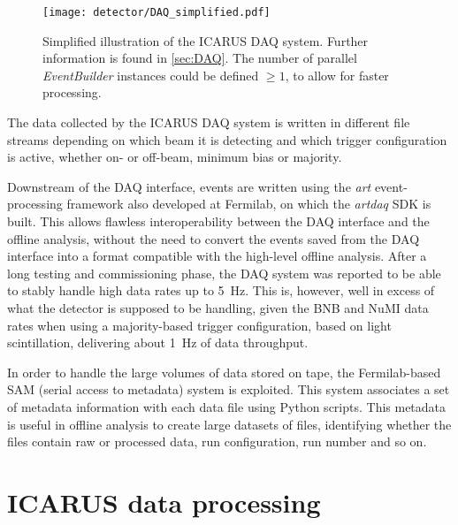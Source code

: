 \begin{figure}
    \centering
    \texttt{[image: detector/DAQ\_simplified.pdf]}
    \caption[ICARUS DAQ illustration]{Simplified illustration of the ICARUS DAQ system. Further information is found in \autoref{sec:DAQ}. The number of parallel \emph{EventBuilder} instances could be defined $\geq1$, to allow for faster processing.}
    \label{fig:DAQ}
\end{figure}

The data collected by the ICARUS DAQ system is written in different file streams depending on which beam it is detecting and which trigger configuration is active, whether on- or off-beam, minimum bias or majority. 

Downstream of the DAQ interface, events are written using the \emph{art} event-processing framework \cite{greenArtFramework2012} also developed at Fermilab, on which the \emph{artdaq} SDK is built. This allows flawless interoperability between the DAQ interface and the offline analysis, without the need to convert the events saved from the DAQ interface into a format compatible with the high-level offline analysis. After a long testing and commissioning phase, the DAQ system was reported to be able to stably handle high data rates up to \SI{5}{\hertz}. This is, however, well in excess of what the detector is supposed to be handling, given the BNB and NuMI data rates when using a majority-based trigger configuration, based on light scintillation, delivering about \SI{1}{\hertz} of data throughput.  

In order to handle the large volumes of data stored on tape, the Fermilab-based SAM (serial access to metadata) system is exploited. This system associates a set of metadata information with each data file using Python scripts. This metadata is useful in offline analysis to create large datasets of files, identifying whether the files contain raw or processed data, run configuration, run number and so on.

\section{ICARUS data processing}

